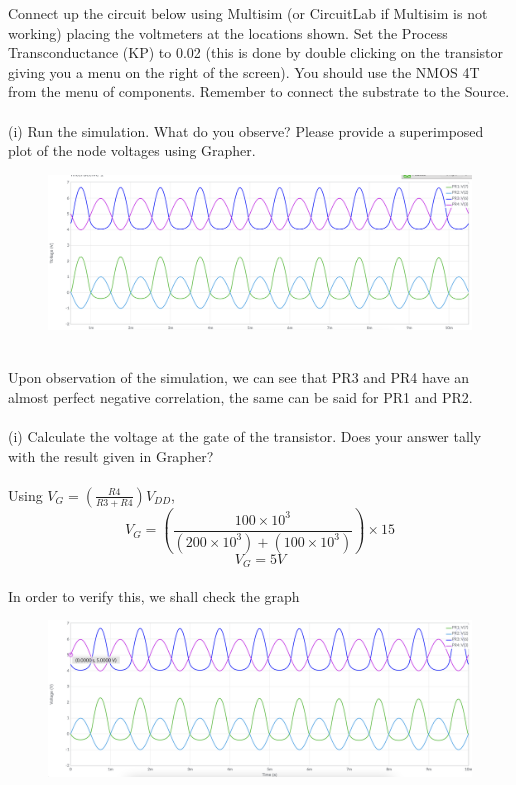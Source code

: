 \documentclass[12pt]{article}
\begin{document}
\noindent Connect up the circuit below using Multisim (or CircuitLab if Multisim is not working) placing the voltmeters at the locations shown. Set the Process Transconductance (KP) to 0.02 (this is done by double clicking on the transistor giving you a menu on the right of the screen). You should use the NMOS 4T from the menu of components. Remember to connect the substrate to the Source.\\
\\
(i) Run the simulation. What do you observe? Please provide a superimposed plot of the node voltages using Grapher.\\
\begin{figure}[!h] 
	\begin{centering}
		\includegraphics[keepaspectratio = true, width = 6in]{q1(i).png}
	\end{centering}
\end{figure}\\
Upon observation of the simulation, we can see that PR3 and PR4 have an almost perfect negative correlation, the same can be said for PR1 and PR2.\\
\\
(i) Calculate the voltage at the gate of the transistor. Does your answer tally with the result given in Grapher?\\
\\
Using \(V_G = (\frac{R4}{R3 + R4})V_{DD}\),\\
\[V_G = (\frac{100\times 10^3}{(200 \times 10^3) + (100 \times 10^3)})\times 15\]
\[V_G = 5V\]\\
\newpage
In order to verify this, we shall check the graph\\
\begin{figure}[!h] 
	\begin{centering}
		\includegraphics[keepaspectratio = true, width = 6in]{q1(ii).png}
	\end{centering}
\end{figure}\\
\end{document}
